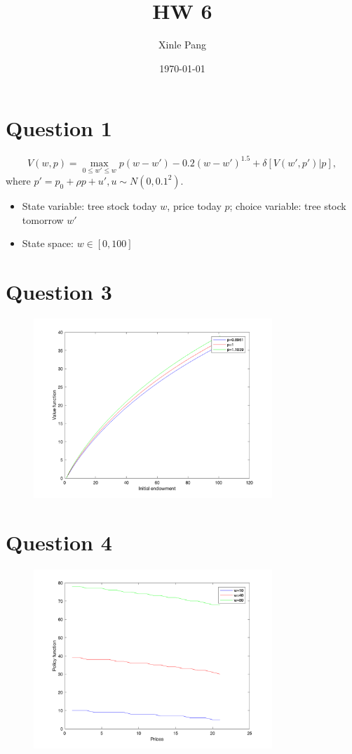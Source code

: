 \documentclass[a4paper, fontsize=12pt]{article}
\title{\vspace{-15mm}\fontsize{18pt}{10pt}\selectfont\textbf{HW 6}}
\author{Xinle Pang}
\date{\today}
\begin{document}
\maketitle %
\section{Question 1}
 $$V(w,p)=\max_{0\leq w'\leq w}p(w-w')-0.2(w-w')^1.5+\delta [V(w',p')|p],$$
 where $p'=p_{0}+\rho p +u', u \sim N(0,0.1^2)$.
 \begin{itemize}
 \item State variable: tree stock today $w$, price today $p$; choice variable:  tree stock tomorrow $w'$
 \item State space: $w \in [0,100]$
 
 
 \end{itemize}
\section{Question 3}
 \begin{figure}[H]
     \centering
     \includegraphics[width=9cm]{1.png}
 \end{figure}
\section{Question 4}
 \begin{figure}[H]
     \centering
     \includegraphics[width=9cm]{2.png}
 \end{figure}
\end{document}
